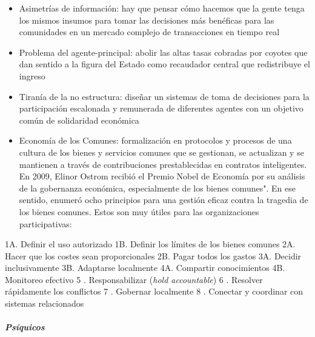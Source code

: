 \documentclass[
]{article}
\providecommand{\tightlist}{%
  \setlength{\itemsep}{0pt}\setlength{\parskip}{0pt}}
\let\oldsubparagraph\subparagraph
\renewcommand{\subparagraph}[1]{\oldsubparagraph{#1}\mbox{}}
\begin{document}
\begin{itemize}
\tightlist
\item
  Asimetrías de información: hay que pensar cómo hacemos que la gente
  tenga los mismos insumos para tomar las decisiones más benéficas para
  las comunidades en un mercado complejo de transacciones en tiempo real
\item
  Problema del agente-principal: abolir las altas tasas cobradas por
  coyotes que dan sentido a la figura del Estado como recaudador central
  que redistribuye el ingreso
\item
  Tiranía de la no estructura: diseñar un sistemas de toma de decisiones
  para la participación escalonada y remunerada de diferentes agentes
  con un objetivo común de solidaridad económica
\item
  Economía de los Comunes: formalización en protocolos y procesos de una
  cultura de los bienes y servicios comunes que se gestionan, se
  actualizan y se mantienen a través de contribuciones prestablecidas en
  contratos inteligentes. En 2009, Elinor Ostrom recibió el Premio Nobel
  de Economía por su análisis de la gobernanza económica, especialmente
  de los bienes comunes". En ese sentido, enumeró ocho principios para
  una gestión eficaz contra la tragedia de los bienes comunes. Estos son
  muy útiles para las organizaciones participativas:
\end{itemize}

1A. Definir el uso autorizado 1B. Definir los límites de los bienes
comunes 2A. Hacer que los costes sean proporcionales 2B. Pagar todos los
gastos 3A. Decidir inclusivamente 3B. Adaptarse localmente 4A. Compartir
conocimientos 4B. Monitoreo efectivo 5 . Responsabilizar (\emph{hold
accountable}) 6 . Resolver rápidamente los conflictos 7 . Gobernar
localmente 8 . Conectar y coordinar con sistemas relacionados

\hypertarget{psuxedquicos}{%
\subparagraph{Psíquicos}\label{psuxedquicos}}
\end{document}
